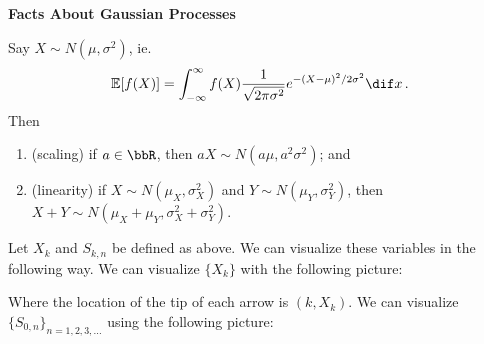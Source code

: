 \documentclass[../../../Master/AppliedStochastics.tex]{subfiles}
\begin{document}
\textbf{\Large Facts About Gaussian Processes}


Say $X \sim N(\mu, \sigma^2)$,
    ie.
\begin{equation*}
    \E[f(X)] = \int_{-\infty}^\infty f(X)
        \frac{1}{\sqrt{2\pi\sigma^2}} e^{- (X - \mu)^2 / 2\sigma^2} \dif x\,.
\end{equation*}
Then 
\begin{enumerate}
    \item (scaling)
    if $a \in \bbR$, then $a X \sim N(a \mu, a^2 \sigma^2)$; and
    
    \item (linearity)
    if $X \sim N(\mu_X, \sigma_X^2)$ and $Y \sim N(\mu_Y, \sigma_Y^2)$,
        then $X + Y\sim N(\mu_X + \mu_Y,\sigma_X^2 + \sigma_Y^2)$.
\end{enumerate}


Let $X_k$ and $S_{k, n}$ be defined as above.
We can visualize these variables in the following way.
We can visualize $\{X_k\}$ with the following picture:
\begin{center}
\end{center}
Where the location of the tip of each arrow is $(k, X_k)$.
We can visualize $\{S_{0,n}\}_{n=1,2,3,\dots}$ using the following picture:
\begin{center}
\end{center}
\end{document}
